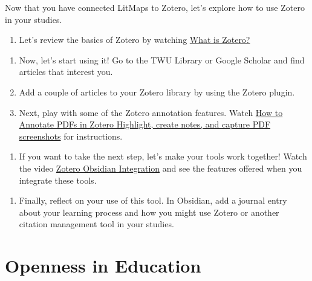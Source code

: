\documentclass[
]{book}
\providecommand{\tightlist}{%
  \setlength{\itemsep}{0pt}\setlength{\parskip}{0pt}}
\theoremstyle{definition}
\theoremstyle{definition}
\theoremstyle{definition}
\theoremstyle{definition}
\theoremstyle{remark}
\begin{document}
\begin{reflect}
Now that you have connected LitMaps to Zotero, let's explore how to use Zotero in your studies.

\begin{enumerate}
\def\labelenumi{\arabic{enumi}.}
\tightlist
\item
  Let's review the basics of Zotero by watching \href{https://www.youtube.com/watch?v=5xClqW2Jv04}{What is Zotero?}
\end{enumerate}

\begin{enumerate}
\def\labelenumi{\arabic{enumi}.}
\setcounter{enumi}{1}
\item
  Now, let's start using it! Go to the TWU Library or Google Scholar and find articles that interest you.
\item
  Add a couple of articles to your Zotero library by using the Zotero plugin.
\item
  Next, play with some of the Zotero annotation features. Watch \href{https://www.youtube.com/watch?v=lGeJCsNHBR4}{How to Annotate PDFs in Zotero \textbar{} Highlight, create notes, and capture PDF screenshots} for instructions.
\end{enumerate}

\begin{enumerate}
\def\labelenumi{\arabic{enumi}.}
\setcounter{enumi}{4}
\tightlist
\item
  If you want to take the next step, let's make your tools work together! Watch the video \href{https://www.youtube.com/watch?v=CGGeMrtyjBI}{Zotero Obsidian Integration} and see the features offered when you integrate these tools.
\end{enumerate}

\begin{enumerate}
\def\labelenumi{\arabic{enumi}.}
\setcounter{enumi}{5}
\tightlist
\item
  Finally, reflect on your use of this tool. In Obsidian, add a journal entry about your learning process and how you might use Zotero or another citation management tool in your studies.
\end{enumerate}
\end{reflect}

\hypertarget{openness-in-education}{%
\section{Openness in Education}\label{openness-in-education}}
\end{document}
